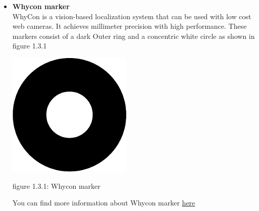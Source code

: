 \documentclass[a4paper,12pt,oneside]{book}
\begin{document}
\begin{itemize}
     
  \item \textbf{Whycon marker\\}
  WhyCon is a vision-based localization system that can be used with low cost web cameras. It achieves millimeter precision with high performance. These markers consist of a dark Outer ring and a concentric white circle as shown in figure 1.3.1
   \begin{center}
         \includegraphics{whycon.png}
    \end{center}
    \begin{center}
          figure 1.3.1: Whycon marker
   \end{center}
  You can find more information about Whycon marker \href{https://github.com/eYSIP-2018/Autotuning-of-Controller-For-Drone/blob/master/Whycon_understanding.pdf}{here}
\end{itemize}

  
\end{document}
